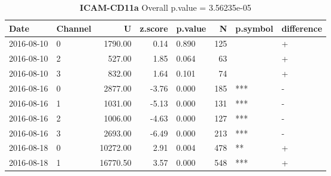 \begin{table}[ht]
\caption[ICAM-CD11a]{\textbf{ICAM-CD11a} Overall p.value = 3.56235e-05}
\centering
\begin{tabular}{llrrlrll}
  \hline
Date & Channel & U & z.score & p.value & N & p.symbol & difference \\ 
  \hline
2016-08-10 & 0 & 1790.00 & 0.14 & 0.890 & 125 &  & + \\ 
  2016-08-10 & 2 & 527.00 & 1.85 & 0.064 &  63 &  & + \\ 
  2016-08-10 & 3 & 832.00 & 1.64 & 0.101 &  74 &  & + \\ 
  2016-08-16 & 0 & 2877.00 & -3.76 & 0.000 & 185 & *** & - \\ 
  2016-08-16 & 1 & 1031.00 & -5.13 & 0.000 & 131 & *** & - \\ 
  2016-08-16 & 2 & 1006.00 & -4.63 & 0.000 & 127 & *** & - \\ 
  2016-08-16 & 3 & 2693.00 & -6.49 & 0.000 & 213 & *** & - \\ 
  2016-08-18 & 0 & 10272.00 & 2.91 & 0.004 & 478 & ** & + \\ 
  2016-08-18 & 1 & 16770.50 & 3.57 & 0.000 & 548 & *** & + \\ 
   \hline
\end{tabular}
\end{table}
